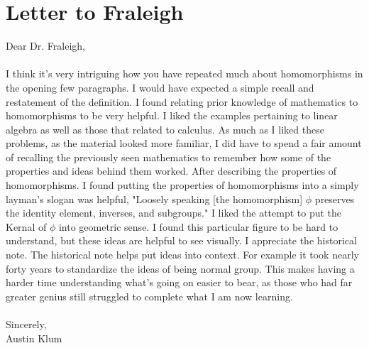 \documentclass[11pt]{article}
\theoremstyle{plain}
\theoremstyle{definition}
\begin{document}
\section{Letter to Fraleigh}
Dear Dr. Fraleigh,\\
\\
I think it's very intriguing how you have repeated much about homomorphisms in the opening few paragraphs. I would have expected a simple recall and restatement of the definition. I found relating prior knowledge of mathematics to homomorphisms to be very helpful. I liked the examples pertaining to linear algebra as well as those that related to calculus. As much as I liked these problems, as the material looked more familiar, I did have to spend a fair amount of recalling the previously seen mathematics to remember how some of the properties and ideas behind them worked. After describing the properties of homomorphisms. I found putting the properties of homomorphisms into a simply layman's slogan was helpful, "Loosely speaking [the homomorphism] $ \phi $ preserves the identity element, inverses, and subgroups." I liked the attempt to put the Kernal of $ \phi $ into geometric sense. I found this particular figure to be hard to understand, but these ideas are helpful to see visually. I appreciate the historical note. The historical note helps put ideas into context. For example it took nearly forty years to standardize the ideas of being normal group. This makes having a harder time understanding what's going on easier to bear, as those who had far greater genius still struggled to complete what I am now learning.\\
\\
Sincerely,\\
Austin Klum
\end{document}
